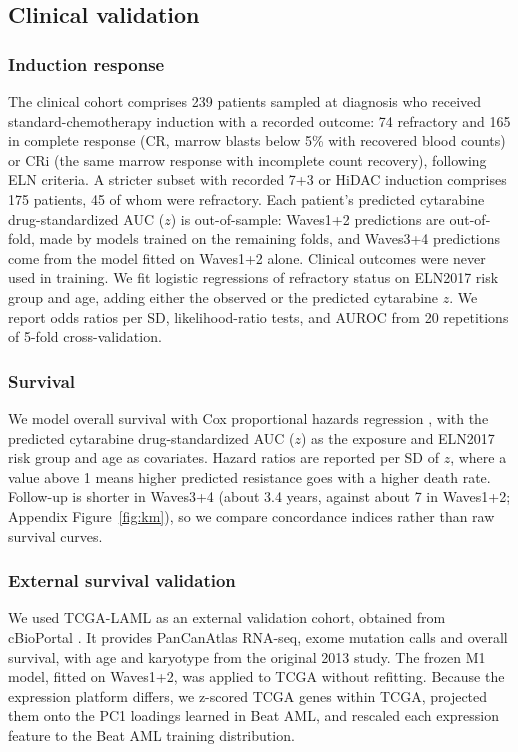 \documentclass[11pt,logo,nonumbering]{preprint}
\newcommand{\z}{z}
\begin{document}
\subsection{Clinical validation}
\subsubsection{Induction response}
The clinical cohort comprises 239 patients sampled at diagnosis who received standard-chemotherapy induction with a recorded outcome: 74 refractory and 165 in complete response (CR, marrow blasts below 5\% with recovered blood counts) or CRi (the same marrow response with incomplete count recovery), following ELN criteria. A stricter subset with recorded 7+3 or HiDAC induction comprises 175 patients, 45 of whom were refractory. Each patient's predicted cytarabine drug-standardized AUC ($\z$) is out-of-sample: Waves1+2 predictions are out-of-fold, made by models trained on the remaining folds, and Waves3+4 predictions come from the model fitted on Waves1+2 alone. Clinical outcomes were never used in training. We fit logistic regressions of refractory status on ELN2017 risk group and age, adding either the observed or the predicted cytarabine $\z$. We report odds ratios per SD, likelihood-ratio tests, and AUROC from 20 repetitions of 5-fold cross-validation.

\subsubsection{Survival}
We model overall survival with Cox proportional hazards regression \citep{davidson2019lifelines}, with the predicted cytarabine drug-standardized AUC ($\z$) as the exposure and ELN2017 risk group and age as covariates. Hazard ratios are reported per SD of $\z$, where a value above 1 means higher predicted resistance goes with a higher death rate. Follow-up is shorter in Waves3+4 (about 3.4 years, against about 7 in Waves1+2; Appendix Figure~\ref{fig:km}), so we compare concordance indices rather than raw survival curves.

\subsubsection{External survival validation}
We used TCGA-LAML \citep{tcga2013laml} as an external validation cohort, obtained from cBioPortal \citep{cerami2012cbioportal}. It provides PanCanAtlas RNA-seq, exome mutation calls and overall survival, with age and karyotype from the original 2013 study. The frozen M1 model, fitted on Waves1+2, was applied to TCGA without refitting. Because the expression platform differs, we z-scored TCGA genes within TCGA, projected them onto the PC1 loadings learned in Beat AML, and rescaled each expression feature to the Beat AML training distribution. 
\end{document}
